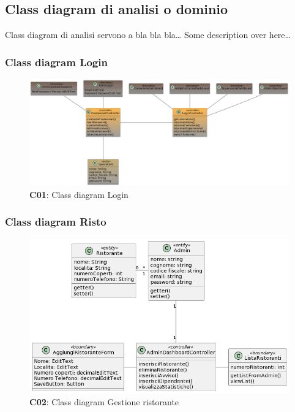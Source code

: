 \subsection{Class diagram di analisi o dominio}

    \begin{flushleft}
        Class diagram di analisi servono a bla bla bla\ldots
        Some description over here\ldots
    \end{flushleft}

    \subsubsection{Class diagram Login}
        \begin{figure}[H]
            \centering
            \includegraphics[scale=0.2]{assets/diagrammi/Class diagram di analisi/Login_3.png}
            \caption{\textbf{C01}: Class diagram Login}\label{fig:Login}
        \end{figure}

    \subsubsection{Class diagram Risto}
        \begin{figure}[H]
            \centering
            \includegraphics[scale=0.5]{assets/diagrammi/Class diagram di analisi/Gestione ristorante.png}
            \caption{\textbf{C02}: Class diagram Gestione ristorante}\label{fig:Ristorante}
        \end{figure}
        

